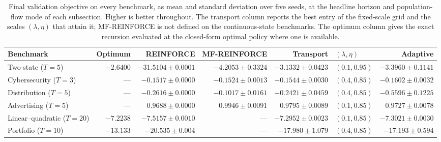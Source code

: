 \begin{table}[H]
\centering
\footnotesize
\setlength{\tabcolsep}{2.6pt}
\begin{tabular}{lrrrrlr}
\toprule
Benchmark & Optimum & REINFORCE & MF-REINFORCE & Transport & $(\lambda,\eta)$ & Adaptive \\
\midrule
Two-state ($T=5$) & $-2.6400$ & $-31.5104\pm0.0001$ & $-4.2053\pm0.3324$ & $-3.1332\pm0.0423$ & $(0.1,0.95)$ & $-3.3960\pm0.1141$ \\
Cybersecurity ($T=3$) & --- & $-0.1517\pm0.0000$ & $-0.1524\pm0.0013$ & $-0.1544\pm0.0030$ & $(0.4,0.85)$ & $-0.1602\pm0.0032$ \\
Distribution ($T=5$) & --- & $-0.2616\pm0.0000$ & $-0.1017\pm0.0161$ & $-0.2421\pm0.0459$ & $(0.4,0.85)$ & $-0.5596\pm0.1225$ \\
Advertising ($T=5$) & --- & $0.9688\pm0.0000$ & $0.9946\pm0.0091$ & $0.9795\pm0.0089$ & $(0.1,0.85)$ & $0.9727\pm0.0078$ \\
Linear--quadratic ($T=20$) & $-7.2238$ & $-7.5157\pm0.0010$ & --- & $-7.2952\pm0.0023$ & $(0.1,0.85)$ & $-7.3021\pm0.0030$ \\
Portfolio ($T=10$) & $-13.133$ & $-20.535\pm0.004$ & --- & $-17.980\pm1.079$ & $(0.4,0.85)$ & $-17.193\pm0.594$ \\
\bottomrule
\end{tabular}
\caption{Final validation objective on every benchmark, as mean and standard deviation over five seeds, at the headline horizon and population-flow mode of each subsection. Higher is better throughout. The transport column reports the best entry of the fixed-scale grid and the scales $(\lambda,\eta)$ that attain it; MF-REINFORCE is not defined on the continuous-state benchmarks. The optimum column gives the exact recursion evaluated at the closed-form optimal policy where one is available.}
\label{tab:objective-summary}
\end{table}
